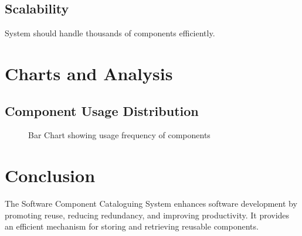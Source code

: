 \documentclass[12pt]{scrreprt}
\begin{document}
\section{Scalability}
System should handle thousands of components efficiently.

\chapter{Charts and Analysis}

\section{Component Usage Distribution}

\begin{figure}[h!]
\centering
{}
\caption{Bar Chart showing usage frequency of components}
\end{figure}

\chapter{Conclusion}

The Software Component Cataloguing System enhances software development by promoting reuse, reducing redundancy, and improving productivity. It provides an efficient mechanism for storing and retrieving reusable components.
\end{document}
